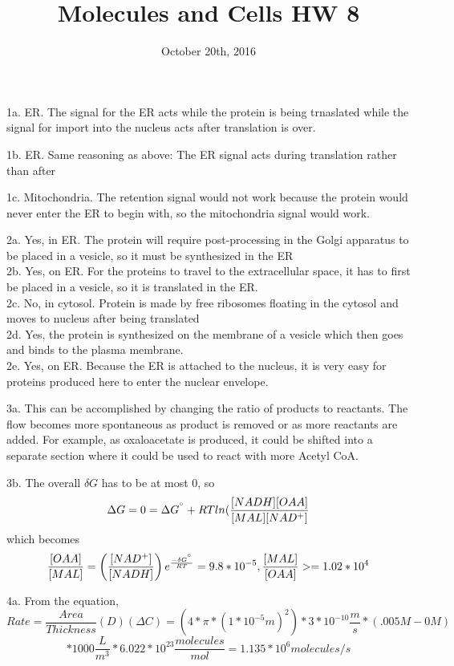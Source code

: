 \documentclass{article}
\title{Molecules and Cells HW 8}
\date{October 20th, 2016}
\begin{document}
\maketitle
1a. ER. The signal  for the ER acts while the protein is being trnaslated while the signal for import into the nucleus acts after translation is over.

1b. ER. Same reasoning as above: The ER signal acts during translation rather than after

1c. Mitochondria. The retention signal would not work because the protein would never enter the ER to begin with, so the mitochondria signal would work.
\vspace{5mm}

2a. Yes, in ER. The protein will require post-processing in the Golgi apparatus to be placed in a vesicle, so it must be synthesized in the ER\\
2b. Yes, on ER. For the proteins to travel to the extracellular space, it has to first be placed in a vesicle, so it is translated in the ER.\\
2c. No, in cytosol. Protein is made by free ribosomes floating in the cytosol and moves to nucleus after being translated\\
2d. Yes, the protein is synthesized on the membrane of a vesicle which then goes and binds to the plasma membrane.\\
2e. Yes, on ER. Because the ER is attached to the nucleus, it is very easy for proteins produced here to enter the nuclear envelope.\\
\vspace{5mm}

3a. This can be accomplished by changing the ratio of products to reactants. The flow becomes more spontaneous as product is removed or as more reactants are added. For example, as oxaloacetate is produced, it could be shifted into a separate section where it could be used to react with more Acetyl CoA.

3b. The overall $\delta G$ has to be at most 0, so
$$\Delta G = 0=\Delta G^{\degree}+RTln(\frac{[NADH][OAA]}{[MAL][NAD^+]}$$
which becomes
$$\frac{[OAA]}{[MAL]}=\left(\frac{[NAD^+]}{[NADH]}\right)e^{\frac{-\delta G^{\degree}}{RT}}=9.8 * 10^{-5}, \frac{[MAL]}{[OAA]}>=1.02*10^4$$
\vspace{5mm}

4a. From the equation,
$$Rate=\frac{Area}{Thickness}(D)(\Delta C)=(4*\pi*(1*10^{-5} m)^2)*3*10^{-10} \frac{m}{s} * (.005M-0M)$$
$$*1000 \frac{L}{m^3}*6.022*10^{23} \frac{molecules}{mol}=1.135*10^6 molecules/s$$
\end{document}
